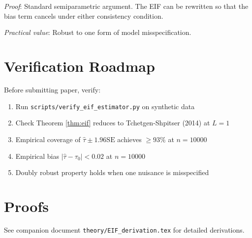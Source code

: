 \documentclass[11pt]{article}
\theoremstyle{plain}
\theoremstyle{definition}
\begin{document}
\textit{Proof}: Standard semiparametric argument. The EIF can be rewritten so that the bias term cancels under either consistency condition.

\textit{Practical value}: Robust to one form of model misspecification.

\section*{Verification Roadmap}

Before submitting paper, verify:
\begin{enumerate}[itemsep=3pt]
    \item Run \texttt{scripts/verify\_eif\_estimator.py} on synthetic data
    \item Check Theorem \ref{thm:eif} reduces to Tchetgen-Shpitser (2014) at $L=1$
    \item Empirical coverage of $\hat\tau \pm 1.96 \hat{\mathrm{SE}}$ achieves $\geq 93\%$ at $n=10000$
    \item Empirical bias $|\hat\tau - \tau_0| < 0.02$ at $n=10000$
    \item Doubly robust property holds when one nuisance is misspecified
\end{enumerate}

\appendix
\section{Proofs}
\label{app:proofs}
See companion document \texttt{theory/EIF\_derivation.tex} for detailed derivations.
\end{document}
